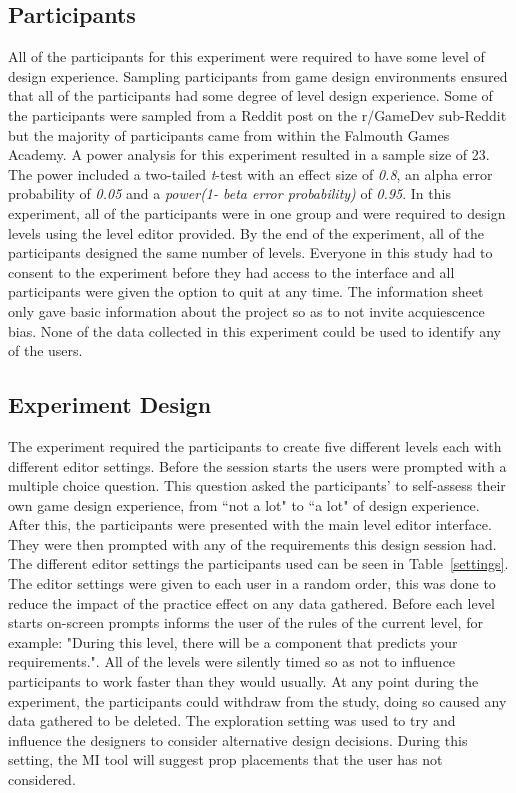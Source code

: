 \documentclass[journal]{IEEEtran}
\begin{document}
\subsection{Participants}
All of the participants for this experiment were required to have some level of design experience. Sampling participants from game design environments ensured that all of the participants had some degree of level design experience. Some of the participants were sampled from a Reddit post on the r/GameDev sub-Reddit but the majority of participants came from within the Falmouth Games Academy.
A power analysis for this experiment resulted in a sample size of 23. The power included a two-tailed \textit{t}-test with an effect size of \textit{0.8}, an alpha error probability of \textit{0.05} and a \textit{power(1- beta error probability)} of \textit{0.95}. In this experiment, all of the participants were in one group and were required to design levels using the level editor provided. By the end of the experiment, all of the participants designed the same number of levels. Everyone in this study had to consent to the experiment before they had access to the interface and all participants were given the option to quit at any time. The information sheet only gave basic information about the project so as to not invite acquiescence bias\cite{watson1992correcting}. None of the data collected in this experiment could be used to identify any of the users.

\subsection{Experiment Design}
The experiment required the participants to create five different levels each with different editor settings. Before the session starts the users were prompted with a multiple choice question. This question asked the participants' to self-assess their own game design experience, from ``not a lot" to ``a lot" of design experience. After this, the participants were presented with the main level editor interface. They were then prompted with any of the requirements this design session had. The different editor settings the participants used can be seen in Table~\ref{settings}. The editor settings were given to each user in a random order, this was done to reduce the impact of the practice effect on any data gathered. Before each level starts on-screen prompts informs the user of the rules of the current level, for example: "During this level, there will be a component that predicts your requirements.". All of the levels were silently timed so as not to influence participants to work faster than they would usually. At any point during the experiment, the participants could withdraw from the study, doing so caused any data gathered to be deleted. The exploration setting was used to try and influence the designers to consider alternative design decisions. During this setting, the MI tool will suggest prop placements that the user has not considered. 
\end{document}
